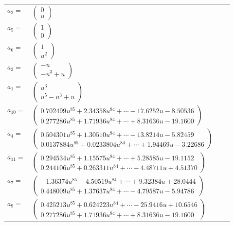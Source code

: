 \documentclass[1p]{elsarticle_modified}
\theoremstyle{definition}
\begin{document}
\begin{tabular}{m{7pt} m{180pt} m{7pt} m{180pt} }
\flushright $a_{2}=$&$\begin{pmatrix}0\\u\end{pmatrix}$ \\
\flushright $a_{5}=$&$\begin{pmatrix}1\\0\end{pmatrix}$ \\
\flushright $a_{6}=$&$\begin{pmatrix}1\\u^2\end{pmatrix}$ \\
\flushright $a_{3}=$&$\begin{pmatrix}- u\\- u^3+u\end{pmatrix}$ \\
\flushright $a_{1}=$&$\begin{pmatrix}u^3\\u^5- u^3+u\end{pmatrix}$ \\
\flushright $a_{10}=$&$\begin{pmatrix}0.702499 u^{85}+2.34358 u^{84}+\cdots-17.6252 u-8.50536\\0.277286 u^{85}+1.71936 u^{84}+\cdots+8.31636 u-19.1600\end{pmatrix}$ \\
\flushright $a_{4}=$&$\begin{pmatrix}0.504301 u^{85}+1.30510 u^{84}+\cdots-13.8214 u-5.82459\\0.0137884 u^{85}+0.0233804 u^{84}+\cdots+1.94469 u-3.22686\end{pmatrix}$ \\
\flushright $a_{11}=$&$\begin{pmatrix}0.294534 u^{85}+1.15575 u^{84}+\cdots+5.28585 u-19.1152\\0.244106 u^{85}+0.263311 u^{84}+\cdots-4.48711 u+4.51370\end{pmatrix}$ \\
\flushright $a_{7}=$&$\begin{pmatrix}-1.36374 u^{85}-4.50519 u^{84}+\cdots+9.32384 u+28.0444\\0.448009 u^{85}+1.37637 u^{84}+\cdots-4.79587 u-5.94786\end{pmatrix}$ \\
\flushright $a_{9}=$&$\begin{pmatrix}0.425213 u^{85}+0.624223 u^{84}+\cdots-25.9416 u+10.6546\\0.277286 u^{85}+1.71936 u^{84}+\cdots+8.31636 u-19.1600\end{pmatrix}$ \\

\end{tabular}
\end{document}
